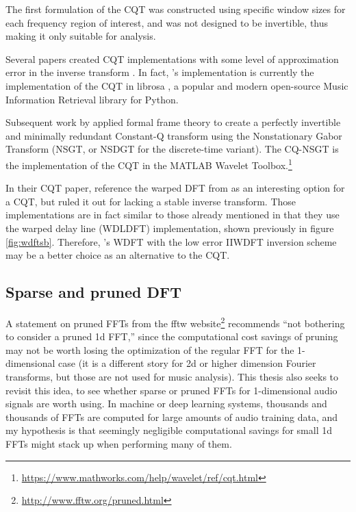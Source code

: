 \documentclass[letter,12pt,notitlepage]{article}
\begin{document}

The first formulation of the CQT was constructed using specific window sizes for each frequency region of interest, and was not designed to be invertible, thus making it only suitable for analysis.

Several papers created CQT implementations with some level of approximation error in the inverse transform \cite{klapuricqt, fitzgeraldcqt}. In fact, \citet{klapuricqt}'s implementation is currently the implementation of the CQT in librosa \cite{librosa}, a popular and modern open-source Music Information Retrieval library for Python.

Subsequent work by \citet{balazs, jaillet, invertiblecqt} applied formal frame theory to create a perfectly invertible and minimally redundant Constant-Q transform using the Nonstationary Gabor Transform (NSGT, or NSDGT for the discrete-time variant). The CQ-NSGT is the implementation of the CQT in the MATLAB Wavelet Toolbox.\footnote{\href{https://www.mathworks.com/help/wavelet/ref/cqt.html}{https://www.mathworks.com/help/wavelet/ref/cqt.html}} 

In their CQT paper, \citet{klapuricqt} reference the warped DFT from \citet{warpedold1, warpedold2} as an interesting option for a CQT, but ruled it out for lacking a stable inverse transform. Those implementations are in fact similar to those already mentioned \cite{earlywarped1, earlywarped2} in that they use the warped delay line (WDLDFT) implementation, shown previously in figure \ref{fig:wdftsb}. Therefore, \citet{warped2}'s WDFT with the low error IIWDFT inversion scheme may be a better choice as an alternative to the CQT.

\subsection{Sparse and pruned DFT}

A statement on pruned FFTs from the fftw website\footnote{\href{http://www.fftw.org/pruned.html}{http://www.fftw.org/pruned.html}} recommends ``not bothering to consider a pruned 1d FFT,'' since the computational cost savings of pruning may not be worth losing the optimization of the regular FFT for the 1-dimensional case (it is a different story for 2d or higher dimension Fourier transforms, but those are not used for music analysis). This thesis also seeks to revisit this idea, to see whether sparse or pruned FFTs for 1-dimensional audio signals are worth using. In machine or deep learning systems, thousands and thousands of FFTs are computed for large amounts of audio training data, and my hypothesis is that seemingly negligible computational savings for small 1d FFTs might stack up when performing many of them.
\end{document}
